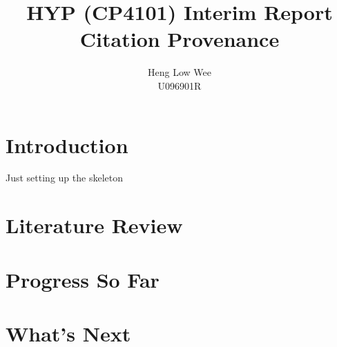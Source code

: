 \documentclass[12 pt]{article}
\begin{document}

\title{HYP (CP4101) Interim Report \\ Citation Provenance}
\author{Heng Low Wee \\ U096901R}
\maketitle

\section{Introduction}
Just setting up the skeleton\cite{itmakessense}
\section{Literature Review}
\section{Progress So Far}
\section{What's Next}

\end{document}
